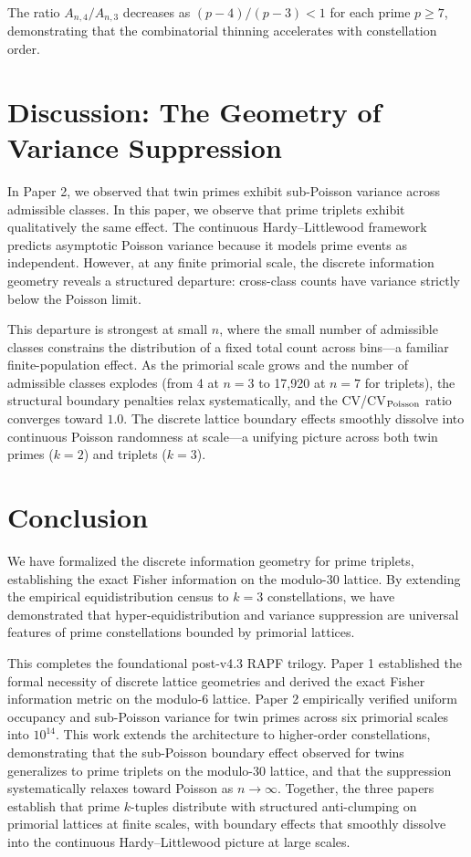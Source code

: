 \documentclass[11pt]{article}
\begin{document}
The ratio $A_{n,4}/A_{n,3}$ decreases as $(p-4)/(p-3) < 1$ for each prime $p \geq 7$, demonstrating that the combinatorial thinning accelerates with constellation order.

\section{Discussion: The Geometry of Variance Suppression}

In Paper 2, we observed that twin primes exhibit sub-Poisson variance across admissible classes. In this paper, we observe that prime triplets exhibit qualitatively the same effect. The continuous Hardy--Littlewood framework predicts asymptotic Poisson variance because it models prime events as independent. However, at any finite primorial scale, the discrete information geometry reveals a structured departure: cross-class counts have variance strictly below the Poisson limit.

This departure is strongest at small $n$, where the small number of admissible classes constrains the distribution of a fixed total count across bins---a familiar finite-population effect. As the primorial scale grows and the number of admissible classes explodes (from 4 at $n=3$ to 17{,}920 at $n=7$ for triplets), the structural boundary penalties relax systematically, and the CV/CV$_{\rm Poisson}$ ratio converges toward $1.0$. The discrete lattice boundary effects smoothly dissolve into continuous Poisson randomness at scale---a unifying picture across both twin primes ($k=2$) and triplets ($k=3$).

\section{Conclusion}

We have formalized the discrete information geometry for prime triplets, establishing the exact Fisher information on the modulo-30 lattice. By extending the empirical equidistribution census to $k=3$ constellations, we have demonstrated that hyper-equidistribution and variance suppression are universal features of prime constellations bounded by primorial lattices. 

This completes the foundational post-v4.3 RAPF trilogy. Paper 1 established the formal necessity of discrete lattice geometries and derived the exact Fisher information metric on the modulo-6 lattice. Paper 2 empirically verified uniform occupancy and sub-Poisson variance for twin primes across six primorial scales into $10^{14}$. This work extends the architecture to higher-order constellations, demonstrating that the sub-Poisson boundary effect observed for twins generalizes to prime triplets on the modulo-30 lattice, and that the suppression systematically relaxes toward Poisson as $n \to \infty$. Together, the three papers establish that prime $k$-tuples distribute with structured anti-clumping on primorial lattices at finite scales, with boundary effects that smoothly dissolve into the continuous Hardy--Littlewood picture at large scales.
\end{document}
